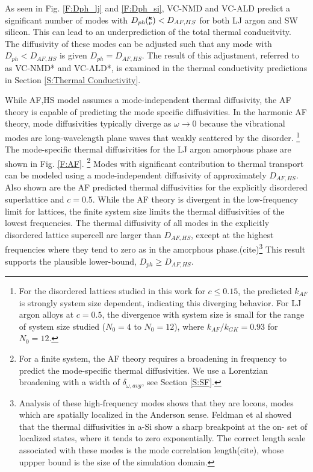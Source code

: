 \documentclass[aps,prb,onecolumn,preprint,superscriptaddress,amsmath,amssymb,floatfix]{revtex4}
\newcommand{\kv}{\mspace{-4.0mu}\left(\mspace{-8.0mu}
\begin{smallmatrix}&\pmb{\kappa} \\&\nu\end{smallmatrix}
\mspace{-3.0mu}\right)}
\begin{document}
As seen in Fig. \ref{F:Dph_lj} and \ref{F:Dph_si}, 
VC-NMD and VC-ALD predict a significant 
number of modes with  
$D_{ph}\kv < D_{AF,HS}$ for both LJ argon and SW silicon. 
This can lead to an underprediction of the 
total thermal conducitvity. The diffusivity of these 
modes can be adjusted such that any mode with $D_{ph} < D_{AF,HS}$ is 
given $D_{ph} = D_{AF,HS}$.  The result of this adjustment, 
referred to as VC-NMD* and VC-ALD*, is examined 
in the thermal conductivity predictions in Section 
\ref{S:Thermal Conductivity}.

While AF,HS model assumes a mode-independent thermal diffusivity, 
the AF theory is capable of predicting the mode specific 
diffusivities.\cite{feldman_thermal_1993,feldman_thermal_1993,
feldman_numerical_1999,shenogin_predicting_2009} 
In the harmonic AF theory, mode diffusivities 
typically diverge as $\omega \rightarrow 0$ because
the vibrational modes are long-wavelength plane waves  
that weakly scattered by the disorder.
\cite{sheng_introduction_2006,vitelli_heat_2010}
\footnote[1]
{For the disordered lattices studied 
in this work for $c\le0.15$, the predicted $k_{AF}$ is strongly 
system size dependent, indicating this diverging behavior. 
For LJ argon alloys at $c=0.5$, the divergence with system size is 
small for the range of system size studied ($N_0=4$ to $N_0=12$), 
where $k_{AF}/k_{GK} = 0.93$ for $N_0=12$.} 
The mode-specific thermal diffusivities for the LJ argon amorphous phase 
are shown in Fig. \ref{F:AF}.
\footnote[2]{For a finite system, the AF theory 
requires a broadening in frequency to predict the mode-specific thermal 
diffusivities.  We use a Lorentzian broadening with a width of 
$\delta_{\omega,avg}$, see Section \ref{S:SF}.} 
Modes with significant 
contribution to thermal transport can be modeled using a mode-independent 
diffusivity of approximately $D_{AF,HS}$.  
Also shown are the AF predicted thermal 
diffusivities for the explicitly disordered superlattice and $c=0.5$. 
While the AF theory is divergent in the low-frequency limit for lattices,  
the finite system size limits the thermal diffusivities of the lowest 
frequencies. The thermal diffusivity of all 
modes in the explicitly disordered lattice supercell are 
larger than $D_{AF,HS}$, except 
at the highest frequencies where they tend to zero as in the amorphous 
phase.(cite)\footnote[3]{Analysis of these high-frequency 
modes shows that they are locons, 
modes which are spatially localized in the Anderson sense. 
Feldman et al showed that the thermal 
diffusivities in a-Si show a sharp breakpoint at the on-
set of localized states, where it tends to zero exponentially. 
The correct 
length scale associated with these modes is the mode correlation 
length(cite), whose uppper bound is the size of the simulation domain.} 
This result supports the plausible lower-bound, $D_{ph} \ge D_{AF,HS}$. 
\end{document}
